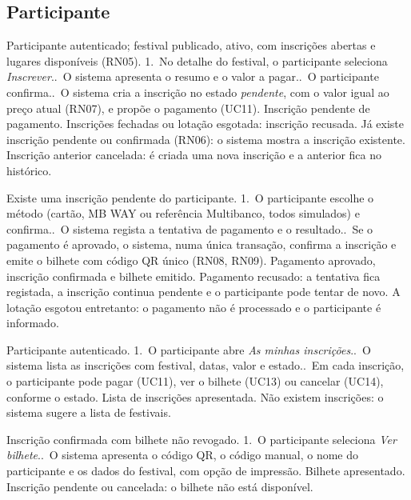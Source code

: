 \subsection{Participante}

{Participante autenticado; festival publicado, ativo, com inscrições abertas e
 lugares disponíveis (RN05).}
{1.~No detalhe do festival, o participante seleciona \emph{Inscrever}..~O sistema apresenta o resumo e o valor a pagar..~O participante confirma..~O sistema cria a inscrição no estado \emph{pendente}, com o valor igual ao
 preço atual (RN07), e propõe o pagamento (UC11).}
{Inscrição pendente de pagamento.}
{Inscrições fechadas ou lotação esgotada: inscrição recusada.
 Já existe inscrição pendente ou confirmada (RN06): o sistema mostra a
 inscrição existente.
 Inscrição anterior cancelada: é criada uma nova inscrição e a anterior
 fica no histórico.}

{Existe uma inscrição pendente do participante.}
{1.~O participante escolhe o método (cartão, MB WAY ou referência
 Multibanco, todos simulados) e confirma..~O sistema regista a tentativa de pagamento e o resultado..~Se o pagamento é aprovado, o sistema, numa única transação, confirma a
 inscrição e emite o bilhete com código QR único (RN08, RN09).}
{Pagamento aprovado, inscrição confirmada e bilhete emitido.}
{Pagamento recusado: a tentativa fica registada, a inscrição continua
 pendente e o participante pode tentar de novo.
 A lotação esgotou entretanto: o pagamento não é processado e o participante
 é informado.}

{Participante autenticado.}
{1.~O participante abre \emph{As minhas inscrições}..~O sistema lista as inscrições com festival, datas, valor e estado..~Em cada inscrição, o participante pode pagar (UC11), ver o bilhete (UC13)
 ou cancelar (UC14), conforme o estado.}
{Lista de inscrições apresentada.}
{Não existem inscrições: o sistema sugere a lista de festivais.}

{Inscrição confirmada com bilhete não revogado.}
{1.~O participante seleciona \emph{Ver bilhete}..~O sistema apresenta o código QR, o código manual, o nome do participante
 e os dados do festival, com opção de impressão.}
{Bilhete apresentado.}
{Inscrição pendente ou cancelada: o bilhete não está disponível.}

